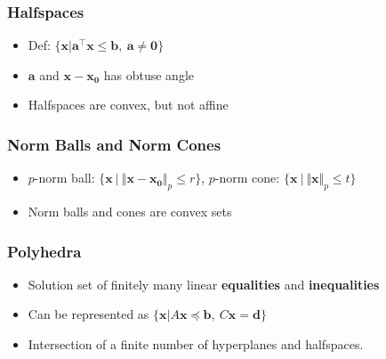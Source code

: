 \subsubsection*{Halfspaces}
\begin{itemize}
    \item Def: $\{\mathbf{x}|\mathbf{a}^{\top}\mathbf{x} \leq \mathbf{b},~\mathbf{a}\neq\mathbf{0}\}$
    \item $\mathbf{a}$ and $\mathbf{x} - \mathbf{x_0}$ has obtuse angle
    \item Halfspaces are convex, but not affine
\end{itemize}

\subsubsection*{Norm Balls and Norm Cones}
\begin{itemize}
    \item $p$-norm ball: $\{\mathbf{x}~|~\Vert \mathbf{x} - \mathbf{x_0} \Vert_p \leq r\}$,
        $p$-norm cone: $\{\mathbf{x}~|~\Vert \mathbf{x} \Vert_p \leq t\}$
    \item Norm balls and cones are convex sets
\end{itemize}

\subsubsection*{Polyhedra}
\begin{itemize}
    \item Solution set of finitely many linear \textbf{equalities} and \textbf{inequalities}
    \item Can be represented as $\{\mathbf{x}|A\mathbf{x} \preceq \mathbf{b},~ C\mathbf{x} = \mathbf{d} \}$
    \item Intersection of a finite number of hyperplanes and halfspaces.
\end{itemize}

